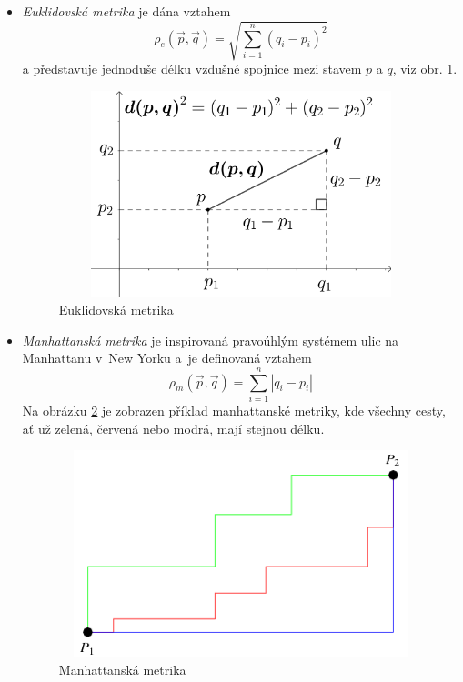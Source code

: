\clearpage
\begin{itemize}
	\item \emph{Euklidovská metrika} je dána vztahem 
	\begin{equation}
	\rho_e\left(\vec{p},\vec{q}\right)=\sqrt{\sum_{i=1}^n\left(q_i-p_i\right)^2}
	\end{equation}
	a představuje jednoduše délku vzdušné spojnice mezi stavem $p$ a $q$, viz obr. \ref{obr:euclid}.
	
	\begin{figure}[htb]
		\begin{center}
			\includegraphics*[width=15cm,height=6cm,keepaspectratio]{obr/euclid}
		\end{center}
		\caption{Euklidovská metrika \cite{euclid}}
		\label{obr:euclid}
	\end{figure}
	
	\item \emph{Manhattanská metrika} je inspirovaná pravoúhlým systémem ulic na Manhattanu v~New Yorku a~je definovaná vztahem
	\begin{equation}
	\rho_m\left(\vec{p},\vec{q}\right)=\sum_{i=1}^n\left|q_i-p_i\right|
	\end{equation}
	Na obrázku \ref{obr:manhat} je zobrazen příklad manhattanské metriky, kde všechny cesty, ať už zelená, červená nebo modrá, mají stejnou délku. 
	
	\begin{figure}[htb]
		\begin{center}
			\includegraphics*[width=15cm,height=6cm,keepaspectratio]{obr/manhat2}
		\end{center}
		\caption{Manhattanská metrika \cite{taxicab}}
		\label{obr:manhat}
	\end{figure}


\end{itemize}
